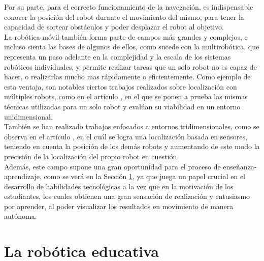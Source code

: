 Por su parte, para el correcto funcionamiento de la navegación, es indispensable
conocer la posición del robot durante el movimiento del mismo, para tener la
capacidad de sortear obstáculos y poder desplazar el robot al objetivo.
\\

La robótica móvil también forma parte de campos más grandes y complejos, e
incluso sienta las bases de algunos de ellos, como sucede con la multirobótica,
que representa un paso adelante en la complejidad y la escala de los sistemas
robóticos individuales, y permite realizar tareas que un solo robot no es capaz
de hacer, o realizarlas mucho mas rápidamente o eficientemente.
Como ejemplo de esta ventaja, son notables ciertos trabajos realizados sobre
localización con múltiples robots, como en el artículo \cite{Trawny2009}, en el
que se ponen a prueba las mismas técnicas utilizadas para un solo robot y
evalúan su viabilidad en un entorno unidimensional.
\\

También se han realizado trabajos enfocados a entornos tridimensionales, como se
observa en el artículo \cite{Fox2000}, en el cuál se logra una localización
basada en sensores, teniendo en cuenta la posición de los demás robots y
aumentando de este modo la precisión de la localización del propio robot en
cuestión.
\\

Además, este campo supone una gran oportunidad para el proceso de
enseñanza-aprendizaje, como se verá en la Sección \ref{sec:robotica_educativa},
ya que juega un papel crucial en el desarrollo de habilidades tecnológicas a la
vez que en la motivación de los estudiantes, los cuales obtienen una gran
sensación de realización y entusiasmo por aprender, al poder visualizar los
resultados en movimiento de manera autónoma.



\section{La robótica educativa}
\label{sec:robotica_educativa} %

